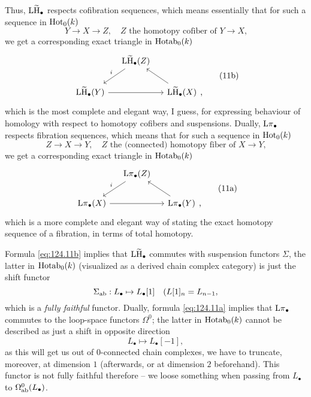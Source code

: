 Thus, $\operatorname{L\widetilde H}_\bullet$ respects cofibration sequences, which
means essentially that for such a sequence in $\operatorname{Hot}_0(k)$
\[Y\to X\to Z,\quad\text{$Z$ the homotopy cofiber of $Y\to X$,}\]
we get a corresponding exact triangle in $\operatorname{Hotab}_0(k)$
\begin{equation}
  \label{eq:124.11b}
  \begin{tabular}{@{}c@{}}
    \begin{tikzcd}[baseline=(O.base),column sep=small]
      & \LtH_\bullet(Z) \ar[dl,"i"'] & \\
      \LtH_\bullet(Y) \ar[rr] & &
      |[alias=O]| \LtH_\bullet(X) \ar[ul]
    \end{tikzcd},
  \end{tabular}\tag{11b}
\end{equation}
which is the most complete and elegant way, I guess, for expressing
behaviour of homology with respect to homotopy cofibers and
suspensions. Dually, $\operatorname{L\pi}_\bullet$ respects fibration sequences,
which means that for such a sequence in $\operatorname{Hot}_0(k)$
\[Z\to X\to Y,\quad\text{$Z$ the (connected) homotopy fiber of $X\to Y$,}\]
we get a corresponding exact triangle in $\operatorname{Hotab}_0(k)$
\begin{equation}
  \label{eq:124.11a}
  \begin{tabular}{@{}c@{}}
    \begin{tikzcd}[baseline=(O.base),column sep=small]
      & \Lpi_\bullet(Z) \ar[dl,"i"'] & \\
      \Lpi_\bullet(X) \ar[rr] & &
      |[alias=O]| \Lpi_\bullet(Y) \ar[ul]
    \end{tikzcd},
  \end{tabular}\tag{11a}
\end{equation}
which is a more complete and elegant way of stating the exact homotopy
sequence of a fibration, in terms of total homotopy.

Formula \eqref{eq:124.11b} implies that $\operatorname{L\widetilde H}_\bullet$ commutes with
suspension functors $\Sigma$, the latter in $\operatorname{Hotab}_0(k)$
(visualized as a derived chain complex category) is just the shift
functor
\[\Sigma_{\mathrm{ab}}: L_\bullet\mapsto L_\bullet[1]\quad
(L[1]_n = L_{n-1},\]
which is a \emph{fully faithful} functor. Dually, formula
\eqref{eq:124.11a} implies that $\operatorname{L\pi}_\bullet$ commutes to the
loop-space functors $\Omega^0$; the latter in $\operatorname{Hotab}_0(k)$
cannot be described as just a shift in opposite direction
\[L_\bullet \mapsto L_\bullet[-1],\]
as this will get us out of $0$-connected chain complexes, we have to
truncate, moreover, at dimension $1$ (afterwards, or at dimension $2$
beforehand). This functor is not fully faithful therefore -- we loose
something when passing from $L_\bullet$ to
$\Omega_{\mathrm{ab}}^0(L_\bullet)$.

